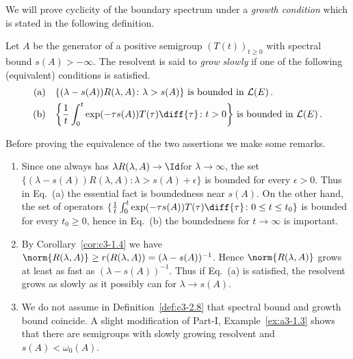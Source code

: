 We will prove cyclicity of the boundary spectrum under a \emph{growth condition}%
which is stated in the following definition.

\begin{definition}\label{def:c3-2.8}
	Let $A$ be the generator of a positive semigroup $(T(t))_{t \geq 0}$ with spectral bound $s(A) > -\infty$.
	The resolvent is said to \emph{grow slowly} if one of the following (equivalent) conditions is satisfied.
	\begin{equation}\label{eq:c3-2.15}
	\begin{split}
	\text{(a)}\quad & \text{$\{(\lambda-s(A))R(\lambda,A) \colon \lambda > s(A)\}$ is bounded in $\mathcal{L}(E)$}\,.\\
	\text{(b)}\quad & \text{$\left\{\frac{1}{t} \int_{0}^{t} \exp(-\tau s(A))T(\tau) \diff{\tau} \colon t > 0\right\}$ is bounded in $\mathcal{L}(E)$}\,.
	\end{split}
	\end{equation}
\end{definition}
Before proving the equivalence of the two assertions we make some remarks.
\begin{remarks*}
\begin{enumerate}[\upshape (i), wide, labelindent=0.5em]
    \item 
    Since one always has \quad $\lambda R(\lambda,A) \to \Id$\quad for \quad $\lambda \to \infty$, 
    the set \quad $\{(\lambda-s(A))R(\lambda,A) \colon \lambda > s(A)+\epsilon\}$ is bounded for every $\epsilon > 0$. 
    Thus in Eq.~(a) the essential fact is boundedness near $s(A)$. 
    On the other hand, the set of operators $\{\frac{1}{t} \int_{0}^{t} \exp(-\tau s(A))T(\tau) \diff{\tau} \colon 0 \leq t \leq t_{0} \}$ is bounded for every $t_{0} \geq 0$, hence in Eq.~(b) the boundedness for $t \to \infty$ is important.

    \item 
    By Corollary~\ref{cor:c3-1.4} we have $\norm{R(\lambda,A)} \geq r(R(\lambda,A)) = (\lambda-s(A))^{-1}$. 
    Hence $\norm{R(\lambda,A)}$ grows at least as fast as $(\lambda-s(A))^{-1}$. 
    Thus if Eq.~(a) is satisfied, the resolvent grows as slowly as it possibly can for $\lambda \to s(A)$.

    \item 
    We do not assume in Definition~\ref{def:c3-2.8} that spectral bound and growth bound coincide.
    A slight modification of Part-I, Example~\ref{ex:a3-1.3} shows that there are semigroups with slowly growing resolvent and $s(A) < \omega_0(A)$.
\end{enumerate}
\end{remarks*}
